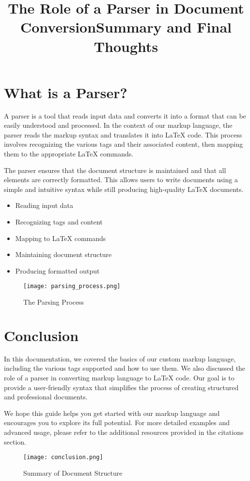 \documentclass[oneside]{memoir}
\begin{document}
\section{What is a Parser?}
\title{The Role of a Parser in Document Conversion}
A parser is a tool that reads input data and converts it into a format that can be easily understood and processed. In the context of our markup language, the parser reads the markup syntax and translates it into LaTeX code. This process involves recognizing the various tags and their associated content, then mapping them to the appropriate LaTeX commands.\par
The parser ensures that the document structure is maintained and that all elements are correctly formatted. This allows users to write documents using a simple and intuitive syntax while still producing high-quality LaTeX documents.\par
\begin{itemize}
\item Reading input data
\item Recognizing tags and content
\item Mapping to LaTeX commands
\item Maintaining document structure
\item Producing formatted output
\end{itemize}
\begin{figure}
\centering
\texttt{[image: parsing\_process.png]}
\caption{The Parsing Process}
\end{figure}

\newpage
\section{Conclusion}
\title{Summary and Final Thoughts}
In this documentation, we covered the basics of our custom markup language, including the various tags supported and how to use them. We also discussed the role of a parser in converting markup language to LaTeX code. Our goal is to provide a user-friendly syntax that simplifies the process of creating structured and professional documents.\par
We hope this guide helps you get started with our markup language and encourages you to explore its full potential. For more detailed examples and advanced usage, please refer to the additional resources provided in the citations section.\par
\begin{figure}
\centering
\texttt{[image: conclusion.png]}
\caption{Summary of Document Structure}
\end{figure}
\end{document}
